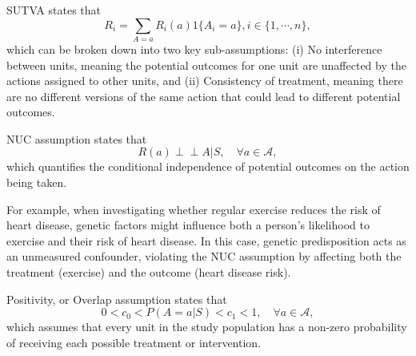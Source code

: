 \begin{assumption}\label{assump:SUTVA} \acrfull{SUTVA} states that
    \begin{equation}
    R_i = \sum_{A=a}R_i(a) {1}\{A_i=a\} , i \in\{ 1, \cdots, n\},
    \end{equation}
    which can be broken down into two key sub-assumptions: (i) No interference between units, meaning the potential outcomes for one unit are unaffected by the actions assigned to other units, and (ii) Consistency of treatment, meaning there are no different versions of the same action that could lead to different potential outcomes. 
\end{assumption}

\begin{assumption}\label{assump:NUC} \acrfull{NUC} assumption states that 
$$R(a) \perp\!\!\!\perp A|S,\quad \forall a\in\mathcal{A},$$  
which quantifies the conditional independence of potential outcomes on the action being taken. 
\end{assumption}
For example, when investigating whether regular exercise reduces the risk of heart disease, genetic factors might influence both a person’s likelihood to exercise and their risk of heart disease. In this case, genetic predisposition acts as an unmeasured confounder, violating the \acrshort{NUC} assumption by affecting both the treatment (exercise) and the outcome (heart disease risk).

\begin{assumption}\label{assump:Positivity} Positivity, or Overlap assumption states that 
$$0 < c_0< P(A=a|S) <c_1< 1, \quad \forall a\in\mathcal{A},$$
which assumes that every unit in the study population has a non-zero probability of receiving each possible treatment or intervention.
\end{assumption}


